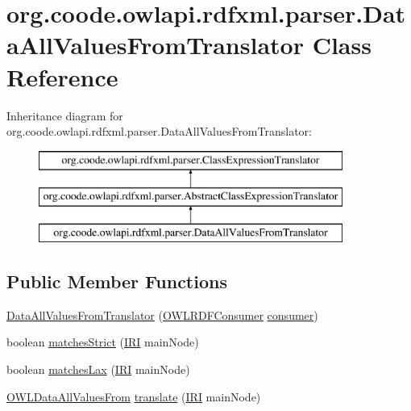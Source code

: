 \hypertarget{classorg_1_1coode_1_1owlapi_1_1rdfxml_1_1parser_1_1_data_all_values_from_translator}{\section{org.\-coode.\-owlapi.\-rdfxml.\-parser.\-Data\-All\-Values\-From\-Translator Class Reference}
\label{classorg_1_1coode_1_1owlapi_1_1rdfxml_1_1parser_1_1_data_all_values_from_translator}
}
Inheritance diagram for org.\-coode.\-owlapi.\-rdfxml.\-parser.\-Data\-All\-Values\-From\-Translator\-:\begin{figure}[H]
\begin{center}
\leavevmode
\includegraphics[height=3.000000cm]{classorg_1_1coode_1_1owlapi_1_1rdfxml_1_1parser_1_1_data_all_values_from_translator}
\end{center}
\end{figure}
\subsection*{Public Member Functions}
\begin{DoxyCompactItemize}
\item 
\hyperlink{classorg_1_1coode_1_1owlapi_1_1rdfxml_1_1parser_1_1_data_all_values_from_translator_a4104eee2bd1e7381fcb916ddc1d76fc3}{Data\-All\-Values\-From\-Translator} (\hyperlink{classorg_1_1coode_1_1owlapi_1_1rdfxml_1_1parser_1_1_o_w_l_r_d_f_consumer}{O\-W\-L\-R\-D\-F\-Consumer} \hyperlink{classorg_1_1coode_1_1owlapi_1_1rdfxml_1_1parser_1_1_abstract_class_expression_translator_ae547084cdd5b92c03835b5aa404f823b}{consumer})
\item 
boolean \hyperlink{classorg_1_1coode_1_1owlapi_1_1rdfxml_1_1parser_1_1_data_all_values_from_translator_a466ad1ae242adc2ba645bc70f966dc2a}{matches\-Strict} (\hyperlink{classorg_1_1semanticweb_1_1owlapi_1_1model_1_1_i_r_i}{I\-R\-I} main\-Node)
\item 
boolean \hyperlink{classorg_1_1coode_1_1owlapi_1_1rdfxml_1_1parser_1_1_data_all_values_from_translator_a2707850dca5b2885ad6dd56f2273a05b}{matches\-Lax} (\hyperlink{classorg_1_1semanticweb_1_1owlapi_1_1model_1_1_i_r_i}{I\-R\-I} main\-Node)
\item 
\hyperlink{interfaceorg_1_1semanticweb_1_1owlapi_1_1model_1_1_o_w_l_data_all_values_from}{O\-W\-L\-Data\-All\-Values\-From} \hyperlink{classorg_1_1coode_1_1owlapi_1_1rdfxml_1_1parser_1_1_data_all_values_from_translator_a88273b7705be2eff274d95850cb1269b}{translate} (\hyperlink{classorg_1_1semanticweb_1_1owlapi_1_1model_1_1_i_r_i}{I\-R\-I} main\-Node)
\end{DoxyCompactItemize}
